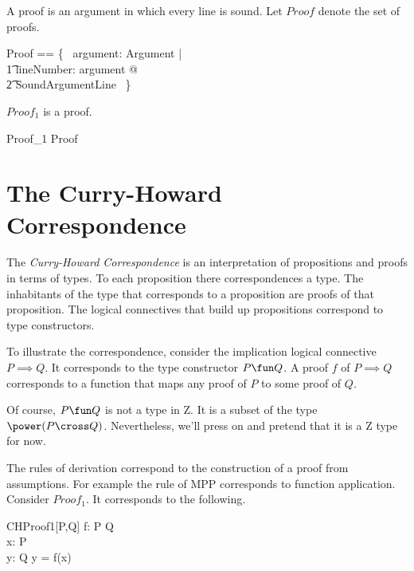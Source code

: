 \documentclass[11pt, oneside]{article}
\begin{document}
A proof is an argument in which every line is sound.
Let $Proof$ denote the set of proofs.

\begin{zed}
	Proof == \{~ argument: Argument | \\
	\t1	\forall lineNumber: \dom argument @ \\
	\t2		SoundArgumentLine ~\}
\end{zed}

\begin{example}
$Proof_1$ is a proof.

\begin{zed}
	Proof_1 \in Proof
\end{zed}

\end{example}

\section{The Curry-Howard Correspondence}

The {\it Curry-Howard Correspondence} is an interpretation of propositions and proofs in terms of types.
To each proposition there correspondences a type.
The inhabitants of the type that corresponds to a proposition are proofs of that proposition.
The logical connectives that build up propositions correspond to type constructors.

To illustrate the correspondence, consider the implication logical connective $P \implies Q$.
It corresponds to the type constructor $P \fun Q$.
A proof $f$ of $P \implies Q$ corresponds to a function that maps any proof of $P$ to some proof of $Q$.

Of course, $P \fun Q$ is not a type in Z. 
It is a subset of the type $\power(P \cross Q)$.
Nevertheless, we'll press on and pretend that it is a Z type for now.

The rules of derivation correspond to the construction of a proof from assumptions.
For example the rule of MPP corresponds to function application.
Consider $Proof_1$.
It corresponds to the following.

\begin{schema}{CHProof1}[P,Q]
	f: P \fun Q \\
	x: P \\
	y: Q
\where
	y = f(x)
\end{schema}

\printbibliography
\end{document}
